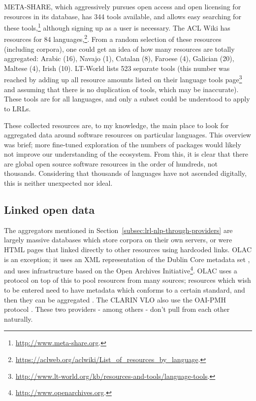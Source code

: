 META-SHARE, which aggressively pursues open access and open licensing for resources in its database, has 344 tools available, and allows easy searching for these tools,\footnote{\href{http://www.meta-share.org/}{http://www.meta-share.org}. } although signing up as a user is necessary. The ACL Wiki has resources for 84 languages,\footnote{\href{https://aclweb.org/aclwiki/List_of_resources_by_language}{https://aclweb.org/aclwiki/List\_of\_resources\_by\_language}. }. From a random selection of these resources (including corpora), one could get an idea of how many resources are totally aggregated: Arabic (16), Navajo (1), Catalan (8), Faroese (4), Galician (20), Maltese (4), Irish (10). LT-World lists 523 separate tools (this number was reached by adding up all resource amounts listed on their language tools page\footnote{\href{http://www.lt-world.org/kb/resources-and-tools/language-tools/}{http://www.lt-world.org/kb/resources-and-tools/language-tools}. } and assuming that there is no duplication of tools, which may be inaccurate). These tools are for all languages, and only a subset could be understood to apply to LRLs.

These collected resources are, to my knowledge, the main place to look for aggregated data around software resources on particular languages. This overview was brief; more fine-tuned exploration of the numbers of packages would likely not improve our understanding of the ecosystem. From this, it is clear that there are global open source software resources in the order of hundreds, not thousands. Considering that thousands of languages have not ascended digitally, this is neither unexpected nor ideal.

\subsection{Linked open data}
\label{subsec:lod}

The aggregators mentioned in Section~\ref{subsec:lrl-nlp-through-providers} are largely massive databases which store corpora on their own servers, or were HTML pages that linked directly to other resources using hardcoded links. OLAC is an exception; it uses an XML representation of the Dublin Core metadata set \citep{dublin1998dublin}, and uses infrastructure based on the Open Archives Initiative\footnote{\href{http://www.openarchives.org}{http://www.openarchives.org}. }. OLAC uses a protocol on top of this to pool resources from many sources; resources which wish to be entered need to have metadata which conforms to a certain standard, and then they can be aggregated \citep{simons2001olac}. The CLARIN VLO \citep{mccrae2015one} also use the OAI-PMH protocol \citep{sompel2004resource, mccrae2015reconciling}. These two providers - among others - don't pull from each other naturally.

